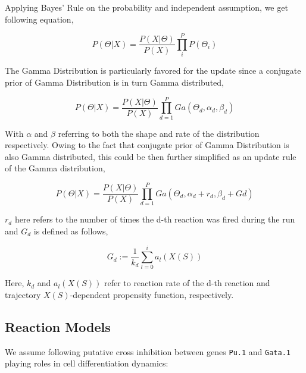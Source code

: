 \documentclass{bioinfo}
\begin{document}
Applying Bayes' Rule on the probability and independent assumption, we get following equation,

\begin{equation}
P(\Theta | X) = \frac{P(X | \Theta)}{P (X)} \prod_{i}^{P} P(\Theta_i)\label{eq:18}
\end{equation}

The Gamma Distribution is particularly favored for the update since a conjugate prior of Gamma Distribution is in turn Gamma distributed,

\begin{equation}
P(\Theta | X) = \frac{P(X | \Theta)}{P (X)} \prod_{d=1}^{P} Ga(\Theta_d, \alpha_d, \beta_d)\label{eq:19}
\end{equation}

With $\alpha$ and $\beta$ referring to both the shape and rate of the distribution respectively. Owing to the fact that conjugate prior of Gamma Distribution is also Gamma distributed, this could be then further simplified as an update rule of the Gamma distribution,

\begin{equation}
P(\Theta | X) = \frac{P(X | \Theta)}{P (X)} \prod_{d=1}^{P} Ga(\Theta_d, \alpha_d + r_d, \beta_d + Gd)\label{eq:20}
\end{equation}

$r_d$ here refers to the number of times the d-th reaction was fired during the run and $G_d$ is defined as follows,

\begin{equation}
G_d := \frac{1}{k_d} \sum_{l=0}^{i} a_{l}(X(S))\label{eq:21}
\end{equation}

Here, $k_d$ and $a_{l}(X(S))$ refer to reaction rate of the d-th reaction and trajectory $X(S)$-dependent propensity function, respectively.

\subsection{Reaction Models}

We assume following putative cross inhibition between genes \texttt{Pu.1} and \texttt{Gata.1} playing roles in cell differentiation dynamics:
\end{document}
